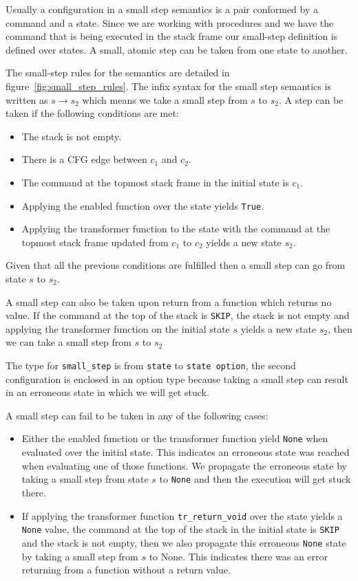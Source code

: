 Usually a configuration in a small step semantics is a pair conformed by a command and a state.
Since we are working with procedures and we have the command that is being executed in the stack frame our small-step definition is defined over states.
A small, atomic step can be taken from one state to another.

The small-step rules for the semantics are detailed in figure~\ref{fig:small_step_rules}.
The infix syntax for the small step semantics is written as $s \rightarrow s_{2}$ which means we take a small step from $s$ to $s_{2}$.
A step can be taken if the following conditions are met:

\begin{itemize}
  \item{The stack is not empty.}
  \item{There is a CFG edge between $c_{1}$ and $c_{2}$.}
  \item{The command at the topmost stack frame in the initial state is $c_{1}$.}
  \item{Applying the enabled function over the state yields \verb|True|.}
  \item{Applying the transformer function to the state with the command at the topmost stack frame updated from $c_{1}$ to $c_{2}$ yields a new state $s_{2}$.}
\end{itemize}

Given that all the previous conditions are fulfilled then a small step can go from state $s$ to $s_{2}$.

A small step can also be taken upon return from a function which returns no value.
If the command at the top of the stack is \verb|SKIP|, the stack is not empty and applying the transformer function on the initial state $s$ yields a new state $s_{2}$, then we can take a small step from $s$ to $s_{2}$

The type for \verb|small_step| is from \verb|state| to \verb|state option|, the second configuration is enclosed in an option type because taking a small step can result in an erroneous state in which we will get stuck.

A small step can fail to be taken in any of the following cases:

\begin{itemize}
  \item{Either the enabled function or the transformer function yield \verb|None| when evaluated over the initial state.
  This indicates an erroneous state was reached when evaluating one of those functions.
  We propagate the erroneous state by taking a small step from state $s$ to \verb|None| and then the execution will get stuck there.}
  \item{If applying the transformer function \verb|tr_return_void| over the state yields a \verb|None| value, the command at the top of the stack in the initial state is \verb|SKIP| and the stack is not empty, then we also propagate this erroneous \verb|None| state by taking a small step from $s$ to None.
  This indicates there was an error returning from a function without a return value.}
\end{itemize}


